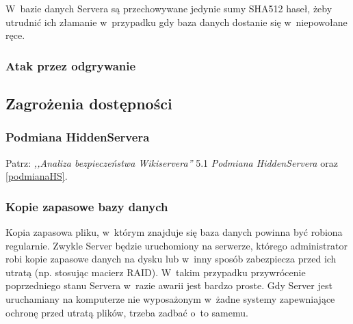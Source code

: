 \documentclass[a4paper,notitlepage]{article}
\begin{document}
W~bazie danych Servera są przechowywane jedynie sumy SHA512 haseł,
żeby utrudnić ich złamanie w~przypadku gdy baza danych dostanie
się w~niepowołane ręce.
\subsubsection{Atak przez odgrywanie}

\subsection{Zagrożenia dostępności}
\subsubsection{Podmiana HiddenServera}
Patrz: \emph{,,Analiza
bezpieczeństwa Wikiservera''} 5.1 \emph{Podmiana HiddenServera} oraz 
\ref{podmianaHS}.
\subsubsection{Kopie zapasowe bazy danych}
Kopia zapasowa pliku, w~którym znajduje się baza danych powinna być
robiona regularnie. Zwykle Server będzie uruchomiony na serwerze, którego
administrator robi kopie zapasowe danych na dysku lub w~inny sposób
zabezpiecza przed ich utratą (np. stosując macierz RAID). W~takim przypadku
przywrócenie poprzedniego stanu Servera w~razie awarii jest bardzo proste.
Gdy Server jest uruchamiany na komputerze nie wyposażonym w~żadne systemy
zapewniające ochronę przed utratą plików, trzeba zadbać o~to samemu.
\end{document}
